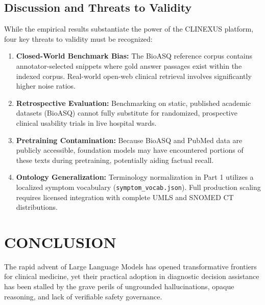 \documentclass[12pt,a4paper]{report}
\begin{document}
\section{Discussion and Threats to Validity}
While the empirical results substantiate the power of the CLINEXUS platform, four key threats to validity must be recognized:
\begin{enumerate}
    \item \textbf{Closed-World Benchmark Bias:} The BioASQ reference corpus contains annotator-selected snippets where gold answer passages exist within the indexed corpus. Real-world open-web clinical retrieval involves significantly higher noise ratios.
    \item \textbf{Retrospective Evaluation:} Benchmarking on static, published academic datasets (BioASQ) cannot fully substitute for randomized, prospective clinical usability trials in live hospital wards.
    \item \textbf{Pretraining Contamination:} Because BioASQ and PubMed data are publicly accessible, foundation models may have encountered portions of these texts during pretraining, potentially aiding factual recall.
    \item \textbf{Ontology Generalization:} Terminology normalization in Part 1 utilizes a localized symptom vocabulary (\texttt{symptom\_vocab.json}). Full production scaling requires licensed integration with complete UMLS and SNOMED CT distributions.
\end{enumerate}

\chapter{CONCLUSION}

The rapid advent of Large Language Models has opened transformative frontiers for clinical medicine, yet their practical adoption in diagnostic decision assistance has been stalled by the grave perils of ungrounded hallucinations, opaque reasoning, and lack of verifiable safety governance.
\end{document}
